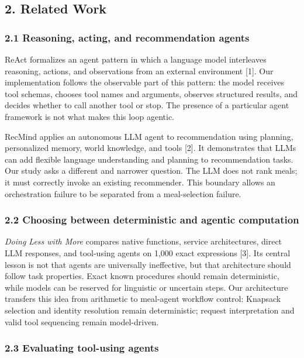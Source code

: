 \documentclass[
  10pt,
  letterpaper,
]{article}
\begin{document}
\subsection{2. Related Work}\label{related-work}

\subsubsection{2.1 Reasoning, acting, and recommendation
agents}\label{reasoning-acting-and-recommendation-agents}

ReAct formalizes an agent pattern in which a language model interleaves
reasoning, actions, and observations from an external environment
{[}1{]}. Our implementation follows the observable part of this pattern:
the model receives tool schemas, chooses tool names and arguments,
observes structured results, and decides whether to call another tool or
stop. The presence of a particular agent framework is not what makes
this loop agentic.

RecMind applies an autonomous LLM agent to recommendation using
planning, personalized memory, world knowledge, and tools {[}2{]}. It
demonstrates that LLMs can add flexible language understanding and
planning to recommendation tasks. Our study asks a different and
narrower question. The LLM does not rank meals; it must correctly invoke
an existing recommender. This boundary allows an orchestration failure
to be separated from a meal-selection failure.

\subsubsection{2.2 Choosing between deterministic and agentic
computation}\label{choosing-between-deterministic-and-agentic-computation}

\emph{Doing Less with More} compares native functions, service
architectures, direct LLM responses, and tool-using agents on 1,000
exact expressions {[}3{]}. Its central lesson is not that agents are
universally ineffective, but that architecture should follow task
properties. Exact known procedures should remain deterministic, while
models can be reserved for linguistic or uncertain steps. Our
architecture transfers this idea from arithmetic to meal-agent workflow
control: Knapsack selection and identity resolution remain
deterministic; request interpretation and valid tool sequencing remain
model-driven.

\subsubsection{2.3 Evaluating tool-using
agents}\label{evaluating-tool-using-agents}
\end{document}
